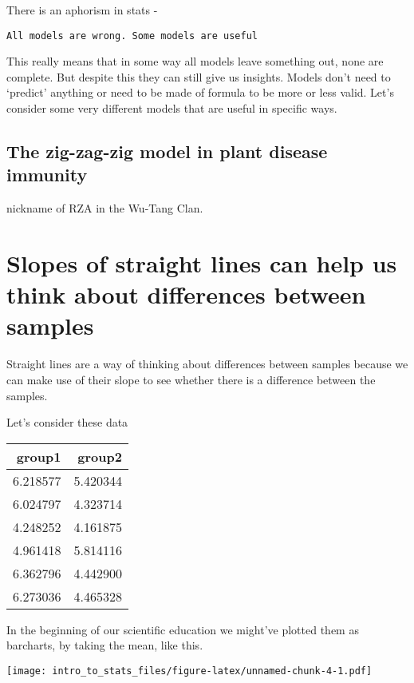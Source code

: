 \documentclass[]{book}
\begin{document}
There is an aphorism in stats -

\texttt{All\ models\ are\ wrong.\ Some\ models\ are\ useful}

This really means that in some way all models leave something out, none are complete. But despite this they can still give us insights. Models don't need to `predict' anything or need to be made of formula to be more or less valid. Let's consider some very different models that are useful in specific ways.

\hypertarget{the-zig-zag-zig-model-in-plant-disease-immunity}{%
\subsection{The zig-zag-zig model in plant disease immunity}\label{the-zig-zag-zig-model-in-plant-disease-immunity}}

nickname of RZA in the Wu-Tang Clan.

\hypertarget{slopes-of-straight-lines-can-help-us-think-about-differences-between-samples}{%
\section{Slopes of straight lines can help us think about differences between samples}\label{slopes-of-straight-lines-can-help-us-think-about-differences-between-samples}}

Straight lines are a way of thinking about differences between samples because we can make use of their slope to see whether there is a difference between the samples.

Let's consider these data

\begin{tabular}{r|r}
\hline
group1 & group2\\
\hline
6.218577 & 5.420344\\
\hline
6.024797 & 4.323714\\
\hline
4.248252 & 4.161875\\
\hline
4.961418 & 5.814116\\
\hline
6.362796 & 4.442900\\
\hline
6.273036 & 4.465328\\
\hline
\end{tabular}

In the beginning of our scientific education we might've plotted them as barcharts, by taking the mean, like this.

\texttt{[image: intro\_to\_stats\_files/figure-latex/unnamed-chunk-4-1.pdf]}
\end{document}
